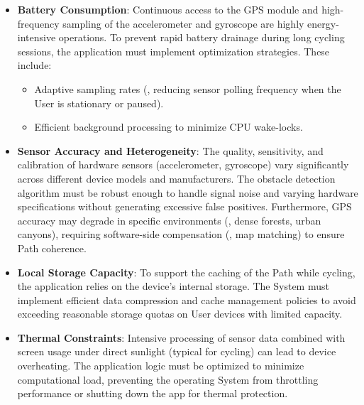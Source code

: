 \begin{itemize}
    \item \textbf{Battery Consumption}: 
    Continuous access to the GPS module and high-frequency sampling of the accelerometer and gyroscope are highly energy-intensive operations. To prevent rapid battery drainage during long cycling sessions, the application must implement optimization strategies. These include:
    \begin{itemize}
        \item Adaptive sampling rates (\eg, reducing sensor polling frequency when the User is stationary or paused).
        \item Efficient background processing to minimize CPU wake-locks.
    \end{itemize}
    
    \item \textbf{Sensor Accuracy and Heterogeneity}: 
    The quality, sensitivity, and calibration of hardware sensors (accelerometer, gyroscope) vary significantly across different device models and manufacturers. The obstacle detection algorithm must be robust enough to handle signal noise and varying hardware specifications without generating excessive false positives. Furthermore, GPS accuracy may degrade in specific environments (\eg, dense forests, urban canyons), requiring software-side compensation (\eg, map matching) to ensure Path coherence.
    
    \item \textbf{Local Storage Capacity}: 
    To support the caching of the Path while cycling, the application relies on the device's internal storage. The System must implement efficient data compression and cache management policies to avoid exceeding reasonable storage quotas on User devices with limited capacity.
    
    \item \textbf{Thermal Constraints}: 
    Intensive processing of sensor data combined with screen usage under direct sunlight (typical for cycling) can lead to device overheating. The application logic must be optimized to minimize computational load, preventing the operating System from throttling performance or shutting down the app for thermal protection.
\end{itemize}
